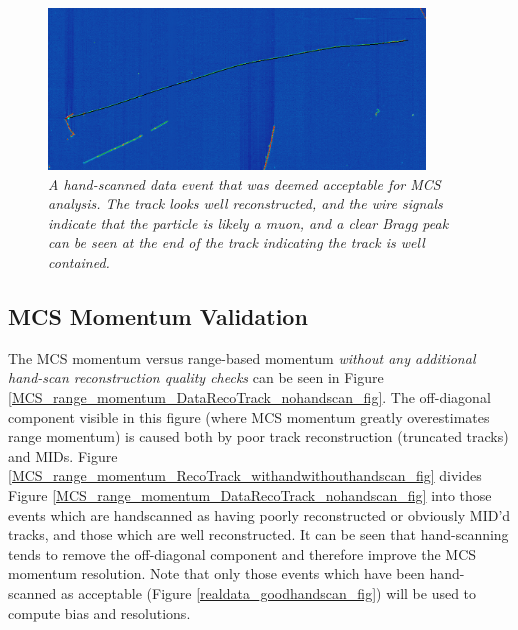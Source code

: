 \begin{figure}[ht!]
\begin{center}
\includegraphics[width=100mm]{Figures/static_figs/good_evd_1.png}
\end{center}
\caption{\textit{A hand-scanned data event that was deemed acceptable for MCS analysis. The track looks well reconstructed, and the wire signals indicate that the particle is likely a muon, and a clear Bragg peak can be seen at the end of the track indicating the track is well contained.}}
\label{good_evd_fig_1}
\end{figure}

\subsection{MCS Momentum Validation}\label{MCS_Momentum_Validation_DataRecoTrack_section}
The MCS momentum versus range-based momentum \textit{without any additional hand-scan reconstruction quality checks} can be seen in Figure \ref{MCS_range_momentum_DataRecoTrack_nohandscan_fig}. The off-diagonal component visible in this figure (where MCS momentum greatly overestimates range momentum) is caused both by poor track reconstruction (truncated tracks) and MIDs. Figure \ref{MCS_range_momentum_RecoTrack_withandwithouthandscan_fig} divides Figure \ref{MCS_range_momentum_DataRecoTrack_nohandscan_fig} into those events which are handscanned as having poorly reconstructed or obviously MID'd tracks, and those which are well reconstructed. It can be seen that hand-scanning tends to remove the off-diagonal component and therefore improve the MCS momentum resolution. Note that only those events which have been hand-scanned as acceptable (Figure \ref{realdata_goodhandscan_fig}) will be used to compute bias and resolutions.\\

